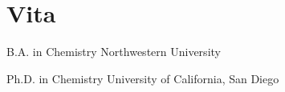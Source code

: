 \newpage

\begingroup
\renewcommand{\cleardoublepage}{}
\chapter*{Vita}
\endgroup

\indent B.A. in Chemistry \hfill Northwestern University

\indent Ph.D. in Chemistry \hfill University of California, San Diego
